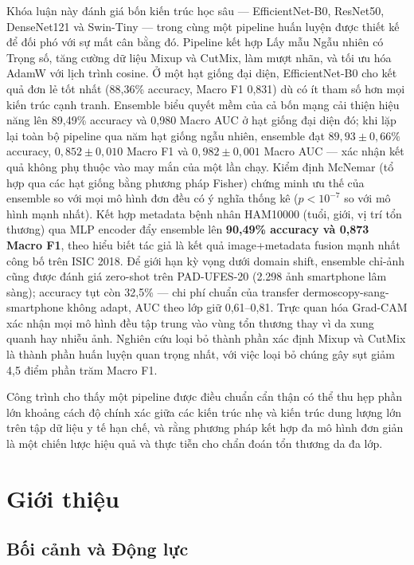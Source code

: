 \documentclass[11pt,a4paper]{report}
\begin{document}
Khóa luận này đánh giá bốn kiến trúc học sâu --- EfficientNet-B0, ResNet50, DenseNet121 và Swin-Tiny --- trong cùng một pipeline huấn luyện được thiết kế để đối phó với sự mất cân bằng đó. Pipeline kết hợp Lấy mẫu Ngẫu nhiên có Trọng số, tăng cường dữ liệu Mixup và CutMix, làm mượt nhãn, và tối ưu hóa AdamW với lịch trình cosine. Ở một hạt giống đại diện, EfficientNet-B0 cho kết quả đơn lẻ tốt nhất (88,36\% accuracy, Macro F1 0,831) dù có ít tham số hơn mọi kiến trúc cạnh tranh. Ensemble biểu quyết mềm của cả bốn mạng cải thiện hiệu năng lên 89,49\% accuracy và 0,980 Macro AUC ở hạt giống đại diện đó; khi lặp lại toàn bộ pipeline qua năm hạt giống ngẫu nhiên, ensemble đạt $89{,}93 \pm 0{,}66\%$ accuracy, $0{,}852 \pm 0{,}010$ Macro F1 và $0{,}982 \pm 0{,}001$ Macro AUC --- xác nhận kết quả không phụ thuộc vào may mắn của một lần chạy. Kiểm định McNemar (tổ hợp qua các hạt giống bằng phương pháp Fisher) chứng minh ưu thế của ensemble so với mọi mô hình đơn đều có ý nghĩa thống kê ($p < 10^{-7}$ so với mô hình mạnh nhất). Kết hợp metadata bệnh nhân HAM10000 (tuổi, giới, vị trí tổn thương) qua MLP encoder đẩy ensemble lên \textbf{90,49\% accuracy và 0,873 Macro F1}, theo hiểu biết tác giả là kết quả image+metadata fusion mạnh nhất công bố trên ISIC 2018. Để giới hạn kỳ vọng dưới domain shift, ensemble chỉ-ảnh cũng được đánh giá zero-shot trên PAD-UFES-20 (2.298 ảnh smartphone lâm sàng); accuracy tụt còn 32,5\% --- chi phí chuẩn của transfer dermoscopy-sang-smartphone không adapt, AUC theo lớp giữ 0,61--0,81. Trực quan hóa Grad-CAM xác nhận mọi mô hình đều tập trung vào vùng tổn thương thay vì da xung quanh hay nhiễu ảnh. Nghiên cứu loại bỏ thành phần xác định Mixup và CutMix là thành phần huấn luyện quan trọng nhất, với việc loại bỏ chúng gây sụt giảm 4,5 điểm phần trăm Macro F1.

Công trình cho thấy một pipeline được điều chuẩn cẩn thận có thể thu hẹp phần lớn khoảng cách độ chính xác giữa các kiến trúc nhẹ và kiến trúc dung lượng lớn trên tập dữ liệu y tế hạn chế, và rằng phương pháp kết hợp đa mô hình đơn giản là một chiến lược hiệu quả và thực tiễn cho chẩn đoán tổn thương da đa lớp.

\tableofcontents
\listoffigures
\listoftables

\chapter{Giới thiệu}

\section{Bối cảnh và Động lực}
\end{document}

